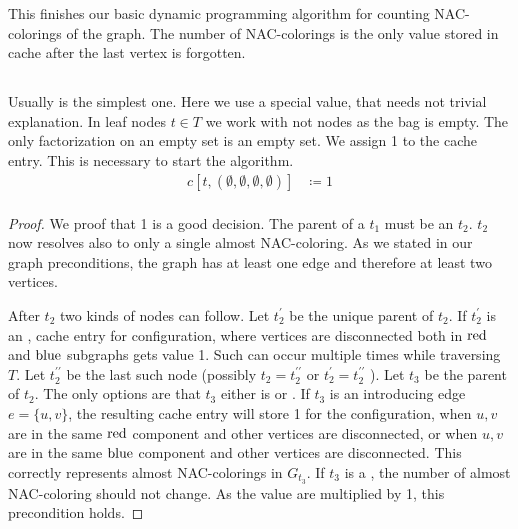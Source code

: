This finishes our basic dynamic programming algorithm
for counting NAC-colorings of the graph.
The number of NAC-colorings is the only value stored in cache
after the last vertex is forgotten.

\subsection{\LeafNode{}}

Usually \LeafNode{} is the simplest one. Here we use a special value,
that needs not trivial explanation.
In leaf nodes \( t \in T \) we work with not nodes as the bag \Xt{} is empty.
The only factorization on an empty set is an empty set.
We assign 1 to the cache entry. This is necessary to start the algorithm.
%
\begin{align*}
	c[t, (\emptyset, \emptyset, \emptyset, \emptyset)] & \coloneqq 1 \\
\end{align*}
%
\begin{proof}
	We proof that 1 is a good decision.
	The parent of a \LeafNode{} \( t_1 \) must be an \IntroduceVertexNode{} \( t_2 \).
	\( t_2 \) now resolves also to only a single almost NAC-coloring.
	As we stated in our graph preconditions, the graph has at least one edge
	and therefore at least two vertices.

	After \( t_2 \) two kinds of nodes can follow.
	Let \( t_2^\prime \) be the unique parent of \( t_2 \).
	If \( t_2^\prime \) is an \IntroduceVertexNode{}, cache entry for configuration,
	where vertices are disconnected both in \( \text{red} \) and \( \text{blue} \) subgraphs
	gets value 1. Such \IntroduceVertexNode{} can occur multiple times
	while traversing \( T \).
	Let \( t_2^{\prime\prime} \) be the last such node
	(possibly \( t_2 = t_2^{\prime\prime}\) or \( t_2^\prime = t_2^{\prime\prime}\) ).
	Let \( t_3 \) be the parent of \( t_2 \).
	The only options are that \( t_3 \) either is \IntroduceEdgeNode{} or \JoinNode{}.
	If \( t_3 \) is an \IntroduceEdgeNode{} introducing edge \( e = \{u, v\} \),
	the resulting cache entry will store 1 for the configuration,
	when \( u ,v \) are in the same \( \text{red}  \) component and other vertices are disconnected, or
	when \( u ,v \) are in the same \( \text{blue} \) component and other vertices are disconnected.
	This correctly represents almost NAC-colorings in \( G_{t_3} \).
	If \( t_3 \) is a \JoinNode{}, the number of almost NAC-coloring should not change.
	As the value are multiplied by 1, this precondition holds.
\end{proof}

